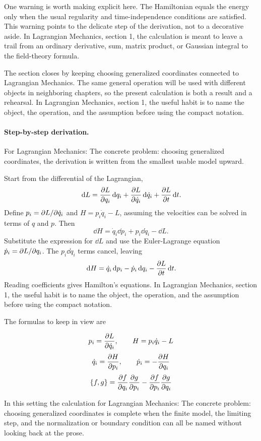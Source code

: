 One warning is worth making explicit here.  The Hamiltonian equals the energy only when the usual regularity and time-independence conditions are satisfied.  This warning points to the delicate step of the derivation, not to a decorative aside.  In Lagrangian Mechanics, section 1, the calculation is meant to leave a trail from an ordinary derivative, sum, matrix product, or Gaussian integral to the field-theory formula.

The section closes by keeping choosing generalized coordinates connected to Lagrangian Mechanics.  The same general operation will be used with different objects in neighboring chapters, so the present calculation is both a result and a rehearsal.  In Lagrangian Mechanics, section 1, the useful habit is to name the object, the operation, and the assumption before using the compact notation.



\paragraph{Step-by-step derivation.}

For Lagrangian Mechanics: The concrete problem: choosing generalized coordinates, the derivation is written from the smallest usable model upward.

Start from the differential of the Lagrangian,
\[
  \,\mathrm d L=\frac{\partial L}{\partial q_i}\,\mathrm d q_i+\frac{\partial L}{\partial\dot q_i}\,\mathrm d\dot q_i+\frac{\partial L}{\partial t}\,\mathrm d t.
\]
Define \(p_i=\partial L/\partial\dot q_i\) and \(H=p_i\dot q_i-L\), assuming the velocities can be solved in terms of \(q\) and \(p\).  Then
\[
  \dd H=\dot q_i\dd p_i+p_i\dd\dot q_i-\dd L.
\]
Substitute the expression for \(\dd L\) and use the Euler-Lagrange equation \(\dot p_i=\partial L/\partial q_i\).  The \(p_i\dd\dot q_i\) terms cancel, leaving
\[
  \,\mathrm d H=\dot q_i\,\mathrm d p_i-\dot p_i\,\mathrm d q_i-\frac{\partial L}{\partial t}\,\mathrm d t.
\]
Reading coefficients gives Hamilton's equations.  In Lagrangian Mechanics, section 1, the useful habit is to name the object, the operation, and the assumption before using the compact notation.

The formulas to keep in view are

\[
  p_i=\frac{\partial L}{\partial\dot q_i},\qquad H=p_i\dot q_i-L
\]
\[
  \dot q_i=\frac{\partial H}{\partial p_i},\qquad \dot p_i=-\frac{\partial H}{\partial q_i}
\]
\[
  \{f,g\}=\frac{\partial f}{\partial q_i}\frac{\partial g}{\partial p_i}-\frac{\partial f}{\partial p_i}\frac{\partial g}{\partial q_i}
\]

In this setting the calculation for Lagrangian Mechanics: The concrete problem: choosing generalized coordinates is complete when the finite model, the limiting step, and the normalization or boundary condition can all be named without looking back at the prose.




